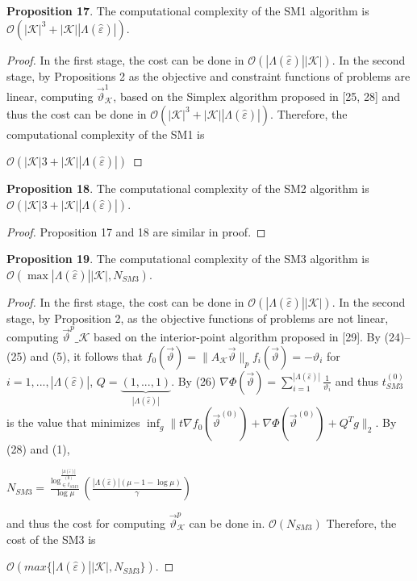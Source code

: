 \documentclass[]{iosart2c}
\begin{document}
  \textbf{Proposition 17}. The computational complexity of the
  SM1 algorithm is $\mathcal{O}(|\mathcal{K}|^3 + |\mathcal{K}| |\Lambda(\hat{\varepsilon} )|)$.

  \begin{proof}
    In the first stage, the cost can be done in
    $\mathcal{O}(|\Lambda(\hat{\varepsilon})| |\mathcal{K}|)$. In the second stage, by Propositions
    2 as the objective and constraint functions of problems
    are linear, computing $\vec{\vartheta}^1_\mathcal{K}$, based on the Simplex
    algorithm proposed in [25, 28] and thus the cost can
    be done in $\mathcal{O}(|\mathcal{K}|^3 + |\mathcal{K}| |\Lambda(\hat{\varepsilon})|)$. Therefore, the computational
    complexity of the SM1 is

    $\mathcal{O}(|\mathcal{K}|3 + |\mathcal{K}| |\Lambda(\hat{\varepsilon})|)$
  \end{proof}

  \textbf{Proposition 18}. The computational complexity of the
  SM2 algorithm is $\mathcal{O}(|\mathcal{K}|3 + |\mathcal{K}| |\Lambda(\hat{\varepsilon})|)$.

  \begin{proof}
    Proposition 17 and 18 are similar in proof.
  \end{proof}

  \textbf{Proposition 19}. The computational complexity of the
  SM3 algorithm is $\mathcal{O}(\max{|\Lambda(\hat{\varepsilon} )| |\mathcal{K}|,N_{SM3}})$.
  \begin{proof}
    In the first stage, the cost can be done in
    $\mathcal{O}(|\Lambda(\hat{\varepsilon})| |\mathcal{K}|)$. In the second stage, by Proposition
    2, as the objective functions of problems are not
    linear, computing $\vec{\vartheta}^p\_\mathcal{K}$
    based on the interior-point algorithm
    proposed in [29]. By (24)–(25) and (5), it
    follows that $f_0(\vec{\vartheta}) = \parallel A_\mathcal{K}\vec{\vartheta}\parallel_p f_i(\vec{\vartheta}) = -\vartheta_i$ for $i =
    1, ... , |\Lambda(\hat{\varepsilon})|$, $Q = \underbrace{(1, ... , 1)}_{|\Lambda(\hat{\varepsilon})|}$. By (26) $\nabla \Phi \left( \vec{\vartheta} \right) = \sum^{|\Lambda(\hat{\varepsilon})|}_{i=1} \frac{1}{\vartheta_i}$
    and thus $t^{(0)}_{SM3}$ is the value that minimizes
    $\inf_g \parallel t \nabla f_0 \left( \vec{\vartheta}^{(0)} \right) +\nabla \Phi \left( \vec{\vartheta}^{(0)} \right)+ Q^T g \parallel _2$. By (28)
    and (1),

    $N_{SM3} = \frac{ \log^{\frac{|\Lambda(\hat{\varepsilon})|}{(0)}}_{\in t_{SM3}}}{\log\mu} \left( \frac{ |\Lambda(\hat{\varepsilon})| (\mu - 1 - \log\mu)}{\gamma} \right)$

    and thus the cost for computing $\vec{\vartheta}^p_\mathcal{K}$ can be done
    in. $\mathcal{O}(N_{SM3})$ Therefore, the cost of the SM3 is

    $\mathcal{O}(max\{|\Lambda(\hat{\varepsilon})| |\mathcal{K}|,N_{SM3}\})$.
  \end{proof}
\end{document}

